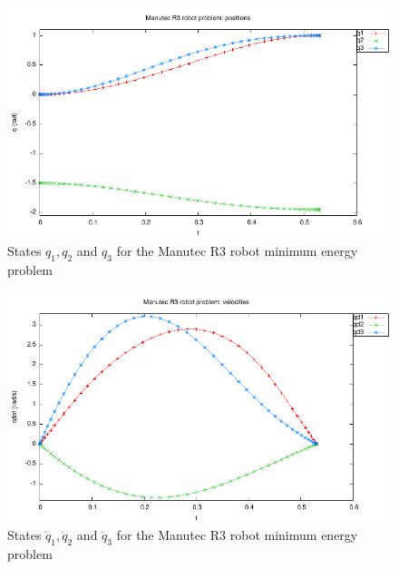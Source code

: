 \documentclass[a4paper,11pt]{report}    %
\newenvironment{shadedframe}{%
  \def\FrameCommand{\fcolorbox{black}{shadecolor}}%
  \MakeFramed {\FrameRestore}}
{\endMakeFramed}
\begin{document}
\begin{shadedframe}

\end{shadedframe}

\begin{figure}
  \centering 
  \includegraphics{../examples/manutec/positions}
  \caption{States $q_1, q_2$ and $q_3$ for the Manutec R3 robot minimum energy  problem}
 \label{fig:manutec_positions}
\end{figure}

\begin{figure}
  \centering 
  \includegraphics{../examples/manutec/velocities}
  \caption{States $\dot q_1, \dot q_2$ and $\dot q_3$ for the Manutec R3 robot minimum energy  problem}
 \label{fig:manutec_velocities}
\end{figure}
\end{document}
